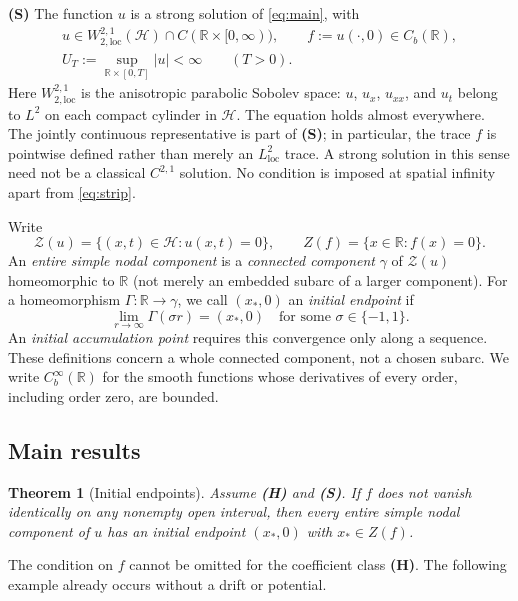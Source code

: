 \documentclass[11pt,reqno]{amsart}
\numberwithin{equation}{section}
\newtheorem{mainthm}{Theorem}
\theoremstyle{definition}
\theoremstyle{remark}
\newcommand{\R}{\mathbb R}
\newcommand{\HH}{\mathcal H}
\newcommand{\ZZ}{\mathcal Z}
\newcommand{\loc}{\mathrm{loc}}
\begin{document}
\smallskip
\noindent\textbf{(S)} The function $u$ is a strong solution of \eqref{eq:main}, with
\begin{gather}
 u\in W^{2,1}_{2,\loc}(\HH)\cap C(\R\times[0,\infty)),
 \qquad f:=u(\cdot,0)\in C_b(\R),\label{eq:S}\\
 U_T:=\sup_{\R\times[0,T]}|u|<\infty\qquad(T>0).\label{eq:strip}
\end{gather}
Here $W^{2,1}_{2,\loc}$ is the anisotropic parabolic Sobolev space:
$u$, $u_x$, $u_{xx}$, and $u_t$ belong to $L^2$ on each compact
cylinder in $\HH$.  The equation holds almost everywhere.  The
jointly continuous representative is part of \textbf{(S)}; in
particular, the trace $f$ is pointwise defined rather than merely an
$L^2_{\loc}$ trace.  A strong solution in this sense need not be a
classical $C^{2,1}$ solution.  No condition is imposed at spatial infinity
apart from \eqref{eq:strip}.

Write
\[
 \ZZ(u)=\{(x,t)\in\HH:u(x,t)=0\},\qquad
 Z(f)=\{x\in\R:f(x)=0\}.
\]
An \emph{entire simple nodal component} is a \emph{connected component}
$\gamma$ of $\ZZ(u)$ homeomorphic to $\R$ (not merely an embedded
subarc of a larger component). For a homeomorphism $\Gamma:\R\to\gamma$, we call $(x_*,0)$ an \emph{initial endpoint} if
\begin{equation}\label{eq:endpointdef}
 \lim_{r\to\infty}\Gamma(\sigma r)=(x_*,0)
 \quad\text{for some }\sigma\in\{-1,1\}.
\end{equation}
An \emph{initial accumulation point} requires this convergence only along a sequence. These definitions concern a whole connected component, not a chosen subarc. We write $C_b^\infty(\R)$ for the smooth functions whose derivatives of every order, including order zero, are bounded.

\subsection{Main results}
\begin{mainthm}[Initial endpoints]\label{thm:A}
Assume \textbf{(H)} and \textbf{(S)}. If $f$ does not vanish identically on any nonempty open interval, then every entire simple nodal component of $u$ has an initial endpoint $(x_*,0)$ with $x_*\in Z(f)$.
\end{mainthm}

The condition on $f$ cannot be omitted for the coefficient class \textbf{(H)}. The following example already occurs without a drift or potential.
\end{document}
